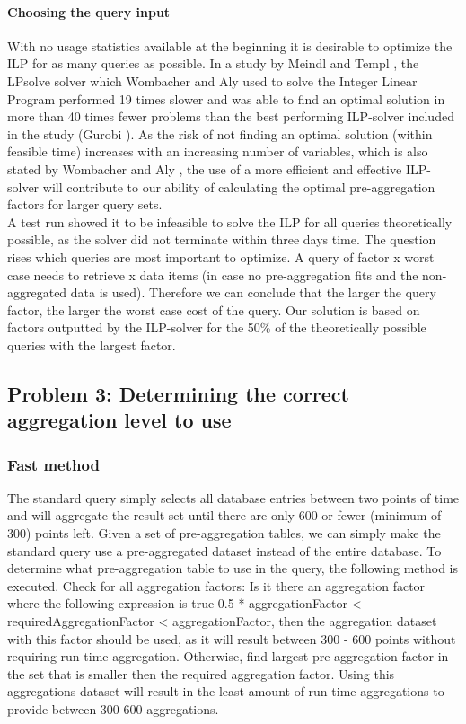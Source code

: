 \paragraph{Choosing the query input}
With no usage statistics available at the beginning it is desirable to optimize the ILP for as many queries as possible. In a study by Meindl and Templ \cite{meindl2012}, the LPsolve solver which Wombacher and Aly \cite{wombacher2011} used to solve the Integer Linear Program performed 19 times slower and was able to find an optimal solution in more than 40 times fewer problems than the best performing ILP-solver included in the study (Gurobi \cite{gurobi}). As the risk of not finding an optimal solution (within feasible time) increases with an increasing number of variables, which is also stated by Wombacher and Aly \cite{wombacher2011}, the use of a more efficient and effective ILP-solver will contribute to our ability of calculating the optimal pre-aggregation factors for larger query sets.\\

A test run showed it to be infeasible to solve the ILP for all queries theoretically possible, as the solver did not terminate within three days time. The question rises which queries are most important to optimize. A query of factor x worst case needs to retrieve x data items (in case no pre-aggregation fits and the non-aggregated data is used). Therefore we can conclude that the larger the query factor, the larger the worst case cost of the query. Our solution is based on factors outputted by the ILP-solver for the 50\% of the theoretically possible queries with the largest factor. 

\subsection{Problem 3: Determining the correct aggregation level to use}
\subsubsection{Fast method}
The standard query simply selects all database entries between two points of time and will aggregate the result set until there are only 600 or fewer (minimum of 300) points left. Given a set of pre-aggregation tables, we can simply make the standard query use a pre-aggregated dataset instead of the entire database. To determine what pre-aggregation table to use in the query, the following method is executed. Check for all aggregation factors: Is it there an aggregation factor where the following expression is true 0.5 * aggregationFactor < requiredAggregationFactor < aggregationFactor, then the aggregation dataset with this factor should be used, as it will result between 300 - 600 points without requiring run-time aggregation. Otherwise, find largest pre-aggregation factor in the set that is smaller then the required aggregation factor. Using this aggregations dataset will result in the least amount of run-time aggregations to provide between 300-600 aggregations.

